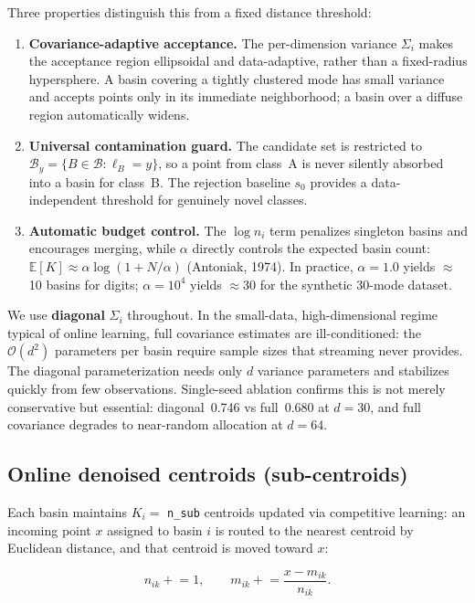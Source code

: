 \documentclass[11pt,a4paper]{article}
\begin{document}
Three properties distinguish this from a fixed distance threshold:
\begin{enumerate}[label=(\arabic*),leftmargin=*]
\item \textbf{Covariance-adaptive acceptance.} The per-dimension variance $\Sigma_i$ makes the acceptance region ellipsoidal and data-adaptive, rather than a fixed-radius hypersphere. A basin covering a tightly clustered mode has small variance and accepts points only in its immediate neighborhood; a basin over a diffuse region automatically widens.
\item \textbf{Universal contamination guard.} The candidate set is restricted to $\mathcal{B}_y = \{B\in\mathcal{B}:\ell_B=y\}$, so a point from class~A is never silently absorbed into a basin for class~B. The rejection baseline $s_0$ provides a data-independent threshold for genuinely novel classes.
\item \textbf{Automatic budget control.} The $\log n_i$ term penalizes singleton basins and encourages merging, while $\alpha$ directly controls the expected basin count: $\mathbb{E}[K] \approx \alpha\log(1 + N/\alpha)$ (Antoniak, 1974). In practice, $\alpha{=}1.0$ yields $\approx$10 basins for digits; $\alpha{=}10^4$ yields $\approx$30 for the synthetic 30-mode dataset.
\end{enumerate}

We use \textbf{diagonal} $\Sigma_i$ throughout. In the small-data, high-dimensional regime typical of online learning, full covariance estimates are ill-conditioned: the $\mathcal{O}(d^2)$ parameters per basin require sample sizes that streaming never provides. The diagonal parameterization needs only $d$ variance parameters and stabilizes quickly from few observations. Single-seed ablation confirms this is not merely conservative but essential: diagonal~0.746 vs full~0.680 at $d{=}30$, and full covariance degrades to near-random allocation at $d{=}64$.

\subsection{Online denoised centroids (sub-centroids)}

Each basin maintains $K_i=$ \texttt{n\_sub} centroids updated via competitive learning: an incoming point $x$ assigned to basin $i$ is routed to the nearest centroid by Euclidean distance, and that centroid is moved toward $x$:

\[
n_{ik} \mathrel{+}= 1, \qquad m_{ik} \mathrel{+}= \frac{x - m_{ik}}{n_{ik}}.
\]
\end{document}
